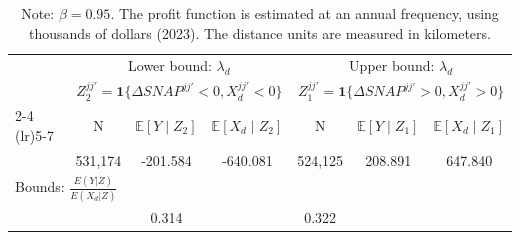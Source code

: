 \begin{table}[ht]
\centering
\caption{Moment Conditions and Distance Trade-offs}
\begin{tabular}{lcccccc}
\toprule
 & \multicolumn{3}{c}{Lower bound: $\lambda_d$} & \multicolumn{3}{c}{Upper bound: $\lambda_d$} \\
& \multicolumn{3}{c}{$Z^{jj'}_2 = \mathbf{1}\{\Delta SNAP^{jj'} < 0, X_d^{jj'} < 0\}$}  & \multicolumn{3}{c}{$Z^{jj'}_1 = \mathbf{1}\{\Delta SNAP^{jj'} > 0, X_d^{jj'} > 0\}$}\\
\cmidrule(lr){2-4} \cmidrule(lr){5-7}
& N & $\mathbb{E}[Y\mid Z_2]$ & $\mathbb{E}[X_d\mid Z_2]$ & N & $\mathbb{E}[Y\mid Z_1]$ & $\mathbb{E}[X_d\mid Z_1]$ \\
\midrule
 &531,174 & -201.584 & -640.081 & 524,125 & 208.891 & 647.840 \\
\midrule
\multicolumn{2}{l}{{Bounds:} $\frac{E(Y|Z)}{E(X_d|Z)}$} &  & & \\
 & & 0.314 & & 0.322 \\
\bottomrule
\end{tabular}
 \captionsetup{font=small, width=.75\textwidth}
\caption*{Note: $\beta=0.95$. The profit function is estimated at an annual frequency, using thousands of dollars (2023). The distance units are measured in kilometers.}
\label{tab:supplybounds}

\end{table}
